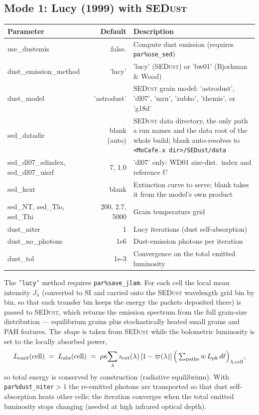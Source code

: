 \documentclass[english,a4paper]{kiseon_memo}
\newcommand{\pp}[1]{\texttt{par\%#1}}
\newcommand{\code}[1]{\texttt{#1}}
\begin{document}
\subsection{Mode 1: Lucy (1999) with \textsc{SEDust}}\label{sec:lucy}
\begin{longtable}{P D X}
\toprule
\textrm{Parameter} & \textrm{Default} & \textrm{Description}\\
\midrule \endhead
use\_dustemis      & .false.   & Compute dust emission (requires \pp{use\_sed})\\
dust\_emission\_method & 'lucy'& 'lucy' (\textsc{SEDust}) or 'bw01' (Bjorkman \& Wood)\\
dust\_model   & 'astrodust' & \textsc{SEDust} grain model: 'astrodust', 'dl07', 'mrn', 'zubko', 'themis', or 'g18d'\\
sed\_datadir       & blank (auto) & \textsc{SEDust} data directory, the only path a run names and the data root of the whole build; blank auto-resolves to \code{<MoCafe.x dir>/SEDust/data}\\
sed\_dl07\_sdindex, sed\_dl07\_uisrf & 7, 1.0 & 'dl07' only: WD01 size-dist.\ index and reference $U$\\
sed\_kext          & blank     & Extinction curve to serve; blank takes it from the model's own product\\
sed\_NT, sed\_Tlo, sed\_Thi & 200, 2.7, 5000 & Grain temperature grid\\
dust\_niter        & 1         & Lucy iterations (dust self-absorption)\\
dust\_no\_photons  & 1e6       & Dust-emission photons per iteration\\
dust\_tol          & 1e-3      & Convergence on the total emitted luminosity\\
\bottomrule
\end{longtable}
The \code{'lucy'} method requires \pp{save\_jlam}.  For each cell the local
mean intensity $J_\lambda$ (converted to SI and carried onto the \textsc{SEDust}
wavelength grid bin by bin, so that each transfer bin keeps the energy the
packets deposited there) is passed to \textsc{SEDust}, which returns
the emission spectrum from the full grain-size distribution --- equilibrium
grains plus stochastically heated small grains and PAH features.  The
\emph{shape} is taken from \textsc{SEDust} while the bolometric
luminosity is set to the locally absorbed power,
\begin{equation}
  L_{\rm emit}(\mathrm{cell}) \;=\; L_{\rm abs}(\mathrm{cell})
   \;=\; \rho\kappa\!\sum_\lambda
   s_{\rm ext}(\lambda)\,[1-\varpi(\lambda)]\,
   \Big(\textstyle\sum_{\rm paths} w\,L_{\rm pk}\,d\ell\Big)_{\lambda,\mathrm{cell}},
\end{equation}
so total energy is conserved by construction (radiative equilibrium).  With
\pp{dust\_niter}${}>1$ the re-emitted photons are transported so that dust
self-absorption heats other cells; the iteration converges when the total
emitted luminosity stops changing (needed at high infrared optical depth).
\end{document}
